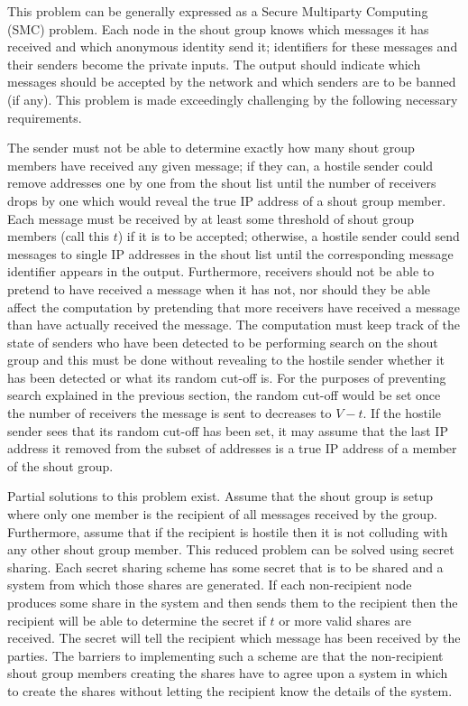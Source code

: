 \documentclass[ %
                    author={Luke Murray},
                supervisor={Dr. Simon Hollis},
                     title={Shadow Peer-to-Peer Networks},
                  subtitle={},
                    degree={MEng},
                      year={2013} ]{thesis}
\begin{document}
This problem can be generally expressed as a Secure Multiparty Computing (SMC) problem\cite{goldreich1998secure}. Each node in the shout group knows which messages it has received and which anonymous identity send it; identifiers for these messages and their senders become the private inputs. The output should indicate which messages should be accepted by the network and which senders are to be banned (if any). This problem is made exceedingly challenging by the following necessary requirements.

The sender must not be able to determine exactly how many shout group members have received any given message; if they can, a hostile sender could remove addresses one by one from the shout list until the number of receivers drops by one which would reveal the true IP address of a shout group member. Each message must be received by at least some threshold of shout group members (call this $t$) if it is to be accepted; otherwise, a hostile sender could send messages to single IP addresses in the shout list until the corresponding message identifier appears in the output. Furthermore, receivers should not be able to pretend to have received a message when it has not, nor should they be able affect the computation by pretending that more receivers have received a message than have actually received the message. The computation must keep track of the state of senders who have been detected to be performing search on the shout group and this must be done without revealing to the hostile sender whether it has been detected or what its random cut-off is. For the purposes of preventing search explained in the previous section, the random cut-off would be set once the number of receivers the message is sent to decreases to $V - t$. If the hostile sender sees that its random cut-off has been set, it may assume that the last IP address it removed from the subset of addresses is a true IP address of a member of the shout group. 

Partial solutions to this problem exist. Assume that the shout group is setup where only one member is the recipient of all messages received by the group. Furthermore, assume that if the recipient is hostile then it is not colluding with any other shout group member. This reduced problem can be solved using secret sharing. Each secret sharing scheme has some secret that is to be shared and a system from which those shares are generated. If each non-recipient node produces some share in the system and then sends them to the recipient then the recipient will be able to determine the secret if $t$ or more valid shares are received. The secret will tell the recipient which message has been received by the parties. The barriers to implementing such a scheme are that the non-recipient shout group members creating the shares have to agree upon a system in which to create the shares without letting the recipient know the details of the system.
\end{document}
